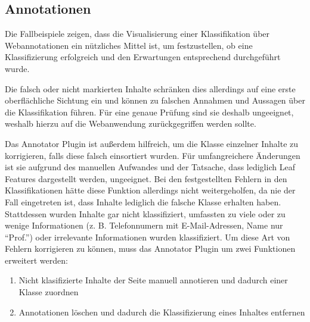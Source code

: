 \subsection{Annotationen}
    Die Fallbeispiele zeigen, dass die Visualisierung einer Klassifikation
    über Webannotationen ein nützliches Mittel ist, um festzustellen,
    ob eine Klassifizierung erfolgreich und den Erwartungen entsprechend durchgeführt wurde.

    Die falsch oder nicht markierten Inhalte schränken dies allerdings
    auf eine erste oberflächliche Sichtung ein
    und können zu falschen Annahmen und Aussagen über die Klassifikation führen.
    Für eine genaue Prüfung sind sie deshalb ungeeignet,
    weshalb hierzu auf die Webanwendung zurückgegriffen werden sollte.

    Das Annotator Plugin ist außerdem hilfreich,
    um die Klasse einzelner Inhalte zu korrigieren,
    falls diese falsch einsortiert wurden.
    Für umfangreichere Änderungen ist sie aufgrund des manuellen Aufwandes
    und der Tatsache, dass lediglich Leaf Features dargestellt werden,
    ungeeignet.
    Bei den festgestellten Fehlern in den Klassifikationen hätte diese
    Funktion allerdings nicht weitergeholfen,
    da nie der Fall eingetreten ist, dass Inhalte lediglich die falsche Klasse erhalten haben.
    Stattdessen wurden Inhalte gar nicht klassifiziert,
    umfassten zu viele oder zu wenige Informationen
    (z. B. Telefonnumern mit E-Mail-Adressen, Name nur "`Prof."')
    oder irrelevante Informationen wurden klassifiziert.
    Um diese Art von Fehlern korrigieren zu können,
    muss das Annotator Plugin um zwei Funktionen erweitert werden:

    \begin{enumerate}
        \item Nicht klasifizierte Inhalte der Seite manuell annotieren und dadurch einer Klasse zuordnen
        \item Annotationen löschen und dadurch die Klassifizierung eines Inhaltes entfernen
    \end{enumerate}